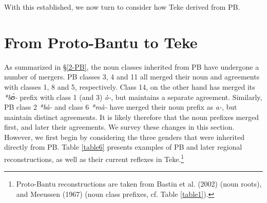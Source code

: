 \documentclass[output=paper,,modfonts,nonflat]{langsci/langscibook-Hyman-et-al}
\begin{document}

With this established, we now turn to consider how Teke derived from PB.


\section{From Proto-Bantu to Teke} 
\label{4-PB-Teke}

As summarized in \S\ref{2-PB}, the noun classes inherited from PB have undergone a number of mergers. PB classes 3, 4 and 11 all merged their noun and agreements with classes 1, 8 and 5, respectively. Class 14, on the other hand has merged its \textit{*bʊ̀-} prefix with class 1 (and 3) \textit{ò-}, but maintains a separate agreement. Similarly, PB class 2 \textit{*bà-} and class 6 \textit{*mà-} have merged their noun prefix as \textit{a-}, but maintain distinct agreements. It is likely therefore that the noun prefixes merged first, and later their agreements. We survey these changes in this section. However, we first begin by considering the three genders that were inherited directly from PB. Table \ref{table6} presents examples of PB and later regional reconstructions, as well as their current reflexes in Teke.\footnote{Proto-Bantu reconstructions are taken from Bastin et al. (2002) (noun roots), and Meeussen (1967) (noun class prefixes, cf. Table \ref{table1}).}
\end{document}

